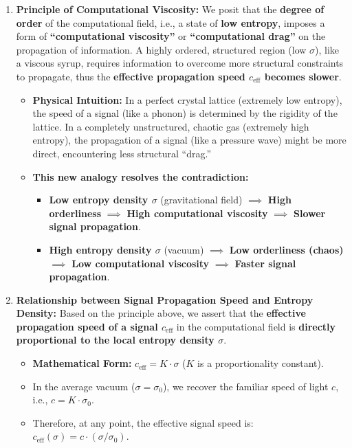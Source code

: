 \documentclass[11pt, a4paper]{article}
\begin{document}
\begin{enumerate}
    \item \textbf{Principle of Computational Viscosity:} We posit that the \textbf{degree of order} of the computational field, i.e., a state of \textbf{low entropy}, imposes a form of \textbf{``computational viscosity''} or \textbf{``computational drag''} on the propagation of information. A highly ordered, structured region (low $\sigma$), like a viscous syrup, requires information to overcome more structural constraints to propagate, thus the \textbf{effective propagation speed $c_{\text{eff}}$ becomes slower}.
    \begin{itemize}
        \item \textbf{Physical Intuition:} In a perfect crystal lattice (extremely low entropy), the speed of a signal (like a phonon) is determined by the rigidity of the lattice. In a completely unstructured, chaotic gas (extremely high entropy), the propagation of a signal (like a pressure wave) might be more direct, encountering less structural ``drag.''
        \item \textbf{This new analogy resolves the contradiction:}
        \begin{itemize}
            \item \textbf{Low entropy density $\sigma$} (gravitational field) $\implies$ \textbf{High orderliness} $\implies$ \textbf{High computational viscosity} $\implies$ \textbf{Slower signal propagation}.
            \item \textbf{High entropy density $\sigma$} (vacuum) $\implies$ \textbf{Low orderliness (chaos)} $\implies$ \textbf{Low computational viscosity} $\implies$ \textbf{Faster signal propagation}.
        \end{itemize}
    \end{itemize}

    \item \textbf{Relationship between Signal Propagation Speed and Entropy Density:} Based on the principle above, we assert that the \textbf{effective propagation speed of a signal $c_{\text{eff}}$} in the computational field is \textbf{directly proportional to the local entropy density $\sigma$}.
    \begin{itemize}
        \item \textbf{Mathematical Form:} $c_{\text{eff}} = K \cdot \sigma$ ($K$ is a proportionality constant).
        \item In the average vacuum ($\sigma=\sigma_0$), we recover the familiar speed of light $c$, i.e., $c = K \cdot \sigma_0$.
        \item Therefore, at any point, the effective signal speed is: \textbf{$c_{\text{eff}}(\sigma) = c \cdot (\sigma / \sigma_0)$}.
    \end{itemize}


\end{enumerate}
\end{document}
